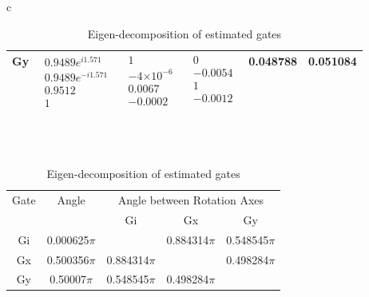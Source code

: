 \documentclass{beamer}
\providecommand{\e}[1]{\ensuremath{\times 10^{#1}}}
\begin{document}
\begin{frame}
\begin{table}[h]
\begin{center}
{\begin{tabular}{c}
\begin{tabular}[l]{|c|c|c|c|c|c|}
Gy & $ \begin{array}{c}
0.9489e^{i1.571} \\ 
0.9489e^{-i1.571} \\ 
0.9512 \\ 
1
 \end{array} $
 & $ \begin{array}{c}
1 \\ 
-4\e{-6} \\ 
0.0067 \\ 
-0.0002
 \end{array} $
 & $ \begin{array}{c}
0 \\ 
-0.0054 \\ 
1 \\ 
-0.0012
 \end{array} $
 & 0.048788 & 0.051084 \\ \hline
\end{tabular}

\\
\vspace{2em}
\\
\begin{tabular}[l]{|c|c|c|c|c|}
\hline
\multirow{2}{*}{Gate} & \multirow{2}{*}{Angle} & \multicolumn{3}{c|}{Angle between Rotation Axes} \\ \cline{3-5}
 & & Gi & Gx & Gy \\ \hline
Gi & 0.000625$\pi$ &  & 0.884314$\pi$ & 0.548545$\pi$ \\ \hline
Gx & 0.500356$\pi$ & 0.884314$\pi$ &  & 0.498284$\pi$ \\ \hline
Gy & 0.50007$\pi$ & 0.548545$\pi$ & 0.498284$\pi$ &  \\ \hline
\end{tabular}

\end{tabular}
}
\caption{Eigen-decomposition of estimated gates}
\end{center}
\end{table}

\end{frame}
\end{document}

